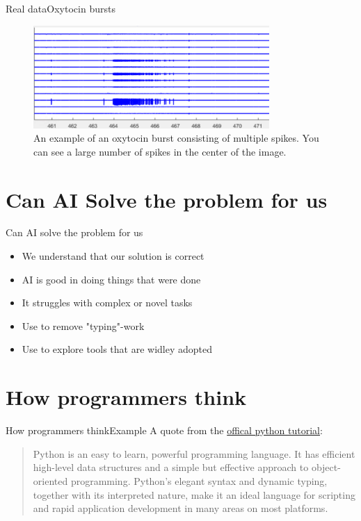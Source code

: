 \documentclass[aspectratio=169]{beamer}
\begin{document}
\begin{frame}{Real data}{Oxytocin bursts}
\begin{figure}[h]
\centering
\includegraphics[width=0.8\textwidth]{../img/OTburst.png}
\caption{
	An example of an oxytocin burst consisting of multiple spikes.
	You can see a large number of spikes in the center of the image.
}
\end{figure}
\end{frame}

\section{Can AI Solve the problem for us}
\begin{frame}{Can AI solve the problem for us}
	\begin{itemize}
		\item We understand that our solution is correct
		\pause
		\item AI is good in doing things that were done
		\pause
		\item It struggles with complex or novel tasks
		\pause
		\item Use to remove "typing"-work
		\pause
		\item Use to explore tools that are widley adopted
	\end{itemize}
\end{frame}

\section{How programmers think}
\begin{frame}{How programmers think}{Example}
A quote from the \href{https://docs.python.org/3/tutorial/index.html}{offical python tutorial}:
\begin{quote}
	Python is an easy to learn, powerful programming language.
	It has efficient high-level data structures
	and a simple but effective approach to object-oriented programming.
	Python’s elegant syntax and dynamic typing, together with its interpreted nature,
	make it an ideal language for scripting and rapid application development in many areas on most platforms.
\end{quote}
\end{frame}
\end{document}
